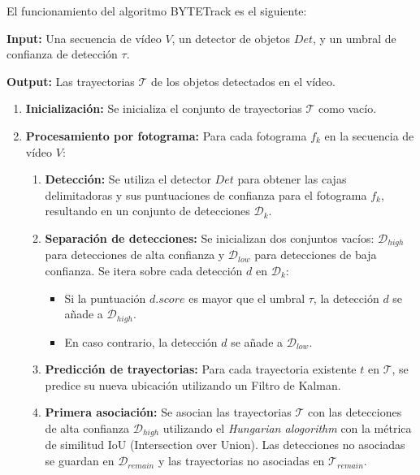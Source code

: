 \documentclass[11pt,spanish,listoffigures,listoftables]{tfgetsinf}
\begin{document}
El funcionamiento del algoritmo BYTETrack es el siguiente:

\textbf{Input:} Una secuencia de vídeo $V$, un detector de objetos $Det$, y un umbral de confianza de detección $\tau$.

\textbf{Output:} Las trayectorias $\mathcal{T}$ de los objetos detectados en el vídeo.

\begin{enumerate}
   \item \textbf{Inicialización:} Se inicializa el conjunto de trayectorias $\mathcal{T}$ como vacío.
   \item \textbf{Procesamiento por fotograma:} Para cada fotograma $f_k$ en la secuencia de vídeo $V$:
   { %
   \renewcommand{\theenumii}{\theenumi.\arabic{enumii}} %
   \renewcommand{\labelenumii}{\theenumii.} %
   \begin{enumerate}
      \item \textbf{Detección:} Se utiliza el detector $Det$ para obtener las cajas delimitadoras y sus puntuaciones de confianza para el fotograma $f_k$, resultando en un conjunto de detecciones $\mathcal{D}_k$.
      \item \textbf{Separación de detecciones:} Se inicializan dos conjuntos vacíos: $\mathcal{D}_{high}$ para detecciones de alta confianza y $\mathcal{D}_{low}$ para detecciones de baja confianza. Se itera sobre cada detección $d$ en $\mathcal{D}_k$:
      \begin{itemize}
         \item Si la puntuación $d.score$ es mayor que el umbral $\tau$, la detección $d$ se añade a $\mathcal{D}_{high}$.
         \item En caso contrario, la detección $d$ se añade a $\mathcal{D}_{low}$.
      \end{itemize}
      \item \textbf{Predicción de trayectorias:} Para cada trayectoria existente $t$ en $\mathcal{T}$, se predice su nueva ubicación utilizando un Filtro de Kalman.
      \item \textbf{Primera asociación:} Se asocian las trayectorias $\mathcal{T}$ con las detecciones de alta confianza $\mathcal{D}_{high}$ utilizando el \textit{Hungarian alogorithm}\cite{kuhn1955hungarian} con la métrica de similitud IoU (Intersection over Union). Las detecciones no asociadas se guardan en $\mathcal{D}_{remain}$ y las trayectorias no asociadas en $\mathcal{T}_{remain}$.

\end{enumerate}}
\end{enumerate}
\end{document}
